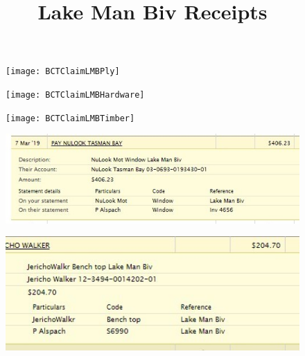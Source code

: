 \documentclass[12pt]{article} %
\title{Lake Man Biv Receipts}
\makeatletter
\renewcommand{\maketitle}{%
  {\bfseries{\scshape{\Large{\@title\par}}}}
}
\makeatother
\begin{document}
  \maketitle

\begin{figure}[H]
\begin{center}
   \texttt{[image: BCTClaimLMBPly]}
\end{center}
\end{figure}

\begin{figure}[H]
\begin{center}
   \texttt{[image: BCTClaimLMBHardware]}
\end{center}
\end{figure}

\begin{figure}[H]
\begin{center}
   \texttt{[image: BCTClaimLMBTimber]}
\end{center}
\end{figure}

%

\begin{figure}[H]
\begin{center}
   \includegraphics[width=16cm]{BCTClaimLMBWindowReceipt}
\end{center}
\end{figure}


\begin{figure}[H]
\begin{center}
   \includegraphics[width=16cm]{BCTClaimLMBBenchtopReceipt}
\end{center}
\end{figure}
\end{document}
